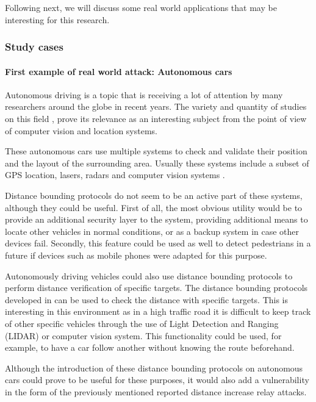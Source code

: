 \documentclass{article}
\begin{document}
Following next, we will discuss some real world applications that may be interesting for this research.

\subsubsection{Study cases}

\paragraph{First example of real world attack: Autonomous cars}

Autonomous driving is a topic that is receiving a lot of attention by many researchers around the globe in recent years. The variety and quantity of studies on this field \cite{franke1999autonomous,continentalautonomous,levinsontowards,geiger2012we}, prove its relevance as an interesting subject from the point of view of computer vision and location systems.

These autonomous cars use multiple systems to check and validate their position and the layout of the surrounding area. Usually these systems include a subset of GPS location, lasers, radars and computer vision systems \cite{continentalautonomous,levinsontowards}.

Distance bounding protocols do not seem to be an active part of these systems, although they could be useful. First of all, the most obvious utility would be to provide an additional security layer to the system, providing additional means to locate other vehicles in normal conditions, or as a backup system in case other devices fail. Secondly, this feature could be used as well to detect pedestrians in a future if devices such as mobile phones were adapted for this purpose. 

Autonomously driving vehicles could also use distance bounding protocols to perform distance verification of specific targets. The distance bounding protocols developed in  \cite{rasmussen2010realization, capkun2006secure} can be used to check the distance with specific targets. This is interesting in this environment as in a high traffic road it is difficult to keep track of other specific vehicles through the use of Light Detection and Ranging (LIDAR) or computer vision system. This functionality could be used, for example, to have a car follow another without knowing the route beforehand.

Although the introduction of these distance bounding protocols on autonomous cars could prove to be useful for these purposes, it would also add a vulnerability in the form of the previously mentioned reported distance increase relay attacks.
\end{document}
